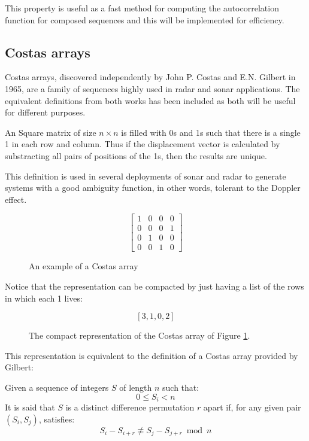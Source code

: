 This property is useful  as a fast method for computing the autocorrelation function for composed sequences and this will be implemented for efficiency.

\subsection{Costas arrays}

Costas arrays, discovered independently by John P. Costas\cite{costas_costas}
and E.N. Gilbert \cite{gilbert_costas} in 1965, are a family of sequences highly
used in radar and sonar applications. The equivalent definitions from both works has been included as both will be useful for different purposes.

\begin{definition}
 An Square matrix of size $n×n$  is filled with 0s and 1s such that there is a single
 1 in each row and column. Thus if the
  displacement vector is calculated by substracting all pairs of positions of the 1s, then  the results are unique.
\end{definition}

This definition is used in several deployments of sonar and radar to generate
systems with a good ambiguity function, in other words, tolerant to the Doppler
effect.

\begin{figure}[ht!]
  $$
  \begin{bmatrix}
   1&0&0&0\\
   0&0&0&1\\
   0&1&0&0\\
   0&0&1&0
  \end{bmatrix}
  $$
  \caption{An example of a Costas array}
  \label{fig:costas_1}
\end{figure}

Notice that the representation can be compacted by just having a list of the
rows in which each 1 lives:

\begin{figure}[ht!]
  $$[3, 1, 0, 2]$$
  \caption{The compact representation of the Costas array of Figure
  \ref{fig:costas_1}.}
  \label{fig:costas_2}
\end{figure}

This representation is equivalent to the definition of a Costas array provided
by Gilbert:

\begin{definition}\label{def:costas_1}
  Given a sequence of integers $S$ of length $n$ such that:
    \begin{equation}\label{eq:costas_1}
      0 \leq S_{i} < n
    \end{equation}
  It is said that $S$ is a distinct difference permutation $r$ apart if,
  for any given pair $(S_{i}, S_{j})$, satisfies:
    \begin{equation}\label{eq:costas_2}
      S_{i} - S_{i+r} \not \equiv S_{j} - S_{j+r} \bmod n
    \end{equation}
\end{definition}

